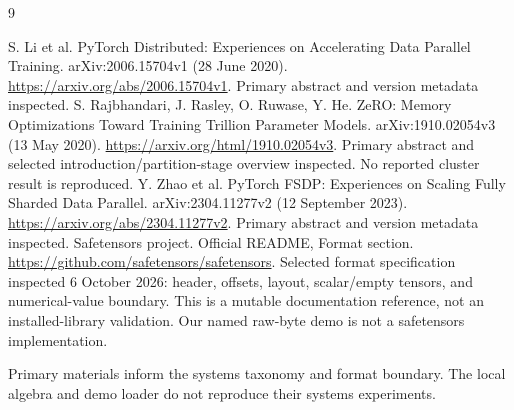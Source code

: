 \renewcommand{\bibname}{Sources and references}
\begin{thebibliography}{9}
 S. Li et al. PyTorch Distributed: Experiences on Accelerating
Data Parallel Training. arXiv:2006.15704v1 (28 June 2020).
\url{https://arxiv.org/abs/2006.15704v1}.
Primary abstract and version metadata inspected.
 S. Rajbhandari, J. Rasley, O. Ruwase, Y. He.
ZeRO: Memory Optimizations Toward Training Trillion Parameter Models.
arXiv:1910.02054v3 (13 May 2020).
\url{https://arxiv.org/html/1910.02054v3}.
Primary abstract and selected introduction/partition-stage overview inspected.
No reported cluster result is reproduced.
 Y. Zhao et al. PyTorch FSDP: Experiences on Scaling Fully Sharded
Data Parallel. arXiv:2304.11277v2 (12 September 2023).
\url{https://arxiv.org/abs/2304.11277v2}.
Primary abstract and version metadata inspected.
 Safetensors project. Official README, Format section.
\url{https://github.com/safetensors/safetensors}.
Selected format specification inspected 6 October 2026: header, offsets, layout,
scalar/empty tensors, and numerical-value boundary.
This is a mutable documentation reference, not an installed-library validation.
Our named raw-byte demo is not a safetensors implementation.
\end{thebibliography}
Primary materials inform the systems taxonomy and format boundary.
The local algebra and demo loader do not reproduce their systems experiments.

